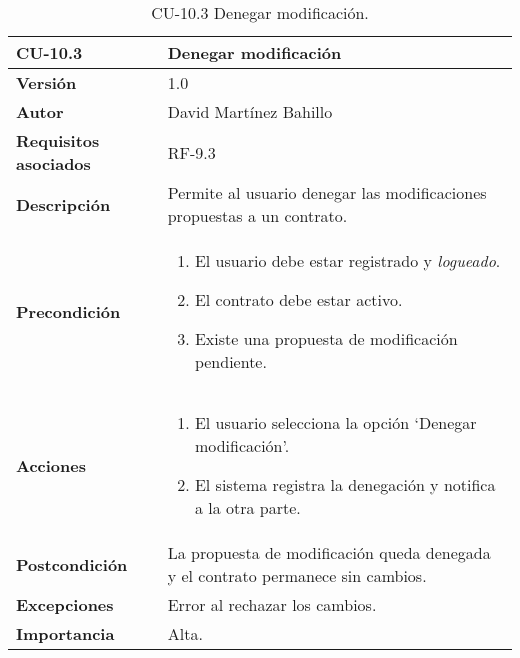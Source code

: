 \begin{table}[p]
	\centering
	\begin{tabularx}{\linewidth}{ p{} p{} }
		\toprule
		\textbf{CU-10.3}  & \textbf{Denegar modificación}\\
		\midrule
		\textbf{Versión}              & 1.0    \\
		\textbf{Autor}                & David Martínez Bahillo \\
		\textbf{Requisitos asociados} & RF-9.3 \\
		\textbf{Descripción}          & Permite al usuario denegar las modificaciones propuestas a un contrato. \\
		\textbf{Precondición}         &  
		\begin{enumerate}
			\item El usuario debe estar registrado y \textit{logueado}.
			\item El contrato debe estar activo.
			\item Existe una propuesta de modificación pendiente.
		\end{enumerate}\\
		\textbf{Acciones}             &
		\begin{enumerate}
			\item El usuario selecciona la opción `Denegar modificación'.
			\item El sistema registra la denegación y notifica a la otra parte.
		\end{enumerate}\\
		\textbf{Postcondición}        & La propuesta de modificación queda denegada y el contrato permanece sin cambios. \\
		\textbf{Excepciones}          & Error al rechazar los cambios. \\
		\textbf{Importancia}          & Alta. \\
		\bottomrule
	\end{tabularx}
	\caption{CU-10.3 Denegar modificación.}
\end{table}


